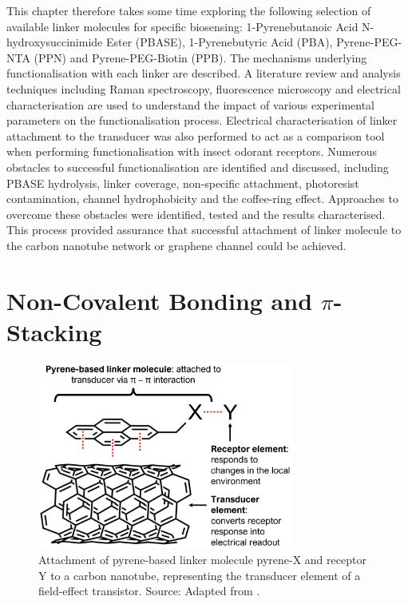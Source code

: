\documentclass[
  a4paper,
]{scrbook}
\begin{document}
This chapter therefore takes some time exploring the following selection
of available linker molecules for specific biosensing: 1-Pyrenebutanoic
Acid N-hydroxysuccinimide Ester (PBASE), 1-Pyrenebutyric Acid (PBA),
Pyrene-PEG-NTA (PPN) and Pyrene-PEG-Biotin (PPB). The mechanisms
underlying functionalisation with each linker are described. A
literature review and analysis techniques including Raman spectroscopy,
fluorescence microscopy and electrical characterisation are used to
understand the impact of various experimental parameters on the
functionalisation process. Electrical characterisation of linker
attachment to the transducer was also performed to act as a comparison
tool when performing functionalisation with insect odorant receptors.
Numerous obstacles to successful functionalisation are identified and
discussed, including PBASE hydrolysis, linker coverage, non-specific
attachment, photoresist contamination, channel hydrophobicity and the
coffee-ring effect. Approaches to overcome these obstacles were
identified, tested and the results characterised. This process provided
assurance that successful attachment of linker molecule to the carbon
nanotube network or graphene channel could be achieved.

\hypertarget{sec-non-covalent-bonding}{%
\section{\texorpdfstring{Non-Covalent Bonding and
\(\pi\)-Stacking}{Non-Covalent Bonding and \textbackslash pi-Stacking}}\label{sec-non-covalent-bonding}}

\begin{figure}

{\centering \includegraphics[width=0.75\textwidth,height=\textheight]{figures/ch7/pyrene-cnt.png}

}

\caption{\label{fig-pi-interaction-cnt}Attachment of pyrene-based linker
molecule pyrene-X and receptor Y to a carbon nanotube, representing the
transducer element of a field-effect transistor. Source: Adapted from
\autocite{Carbonnanotube}.}

\end{figure}
\end{document}
